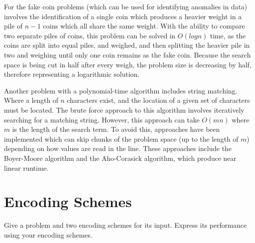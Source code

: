 \documentclass{article}
\renewcommand{\_}{\ifincsname_\else\legacyunderscore\fi}
\begin{document}
For the fake coin problems (which can be used for identifying anomalies in data) involves the identification of a single coin which produces a heavier weight in a pile of $n-1$ coins which all share the same weight. With the ability to compare two separate piles of coins, this problem can be solved in $O(log n)$ time, as the coins are split into equal piles, and weighed, and then splitting the heavier pile in two and weighing until only one coin remains as the fake coin. Because the search space is being cut in half after every weigh, the problem size is decreasing by half, therefore representing a logarithmic solution.

Another problem with a polynomial-time algorithm includes string matching. Where a length of $n$ characters exist, and the location of a given set of characters must be located. The brute force approach to this algorithm involves iteratively searching for a matching string. However, this approach can take $O(mn)$ where $m$ is the length of the search term. To avoid this, approaches have been implemented which can skip chunks of the problem space (up to the length of $m$) depending on how values are read in the line. These approaches include the Boyer-Moore algorithm and the Aho-Corasick algorithm, which produce near linear runtime.

\section*{Encoding Schemes}

    Give a problem and two encoding schemes for its input.  Express its performance using your encoding schemes.
\end{document}
